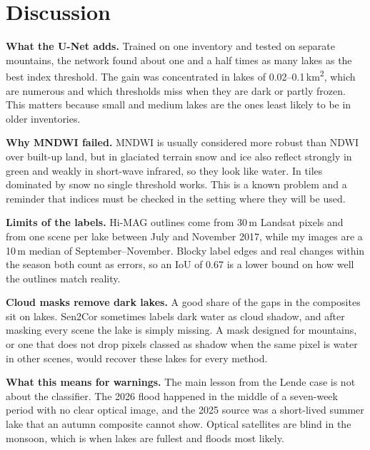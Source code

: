 \documentclass[11pt,a4paper]{article}
\newcommand{\kmsq}{\,km\textsuperscript{2}}
\begin{document}
\section{Discussion}

\textbf{What the U-Net adds.} Trained on one inventory and tested on separate mountains, the network found about one and a half times as many lakes as the best index threshold. The gain was concentrated in lakes of 0.02--0.1\kmsq{}, which are numerous and which thresholds miss when they are dark or partly frozen. This matters because small and medium lakes are the ones least likely to be in older inventories.

\textbf{Why MNDWI failed.} MNDWI is usually considered more robust than NDWI over built-up land, but in glaciated terrain snow and ice also reflect strongly in green and weakly in short-wave infrared, so they look like water. In tiles dominated by snow no single threshold works. This is a known problem and a reminder that indices must be checked in the setting where they will be used.

\textbf{Limits of the labels.} Hi-MAG outlines come from 30\,m Landsat pixels and from one scene per lake between July and November 2017, while my images are a 10\,m median of September--November. Blocky label edges and real changes within the season both count as errors, so an IoU of 0.67 is a lower bound on how well the outlines match reality.

\textbf{Cloud masks remove dark lakes.} A good share of the gaps in the composites sit on lakes. Sen2Cor sometimes labels dark water as cloud shadow, and after masking every scene the lake is simply missing. A mask designed for mountains, or one that does not drop pixels classed as shadow when the same pixel is water in other scenes, would recover these lakes for every method.

\textbf{What this means for warnings.} The main lesson from the Lende case is not about the classifier. The 2026 flood happened in the middle of a seven-week period with no clear optical image, and the 2025 source was a short-lived summer lake that an autumn composite cannot show. Optical satellites are blind in the monsoon, which is when lakes are fullest and floods most likely.
\end{document}
